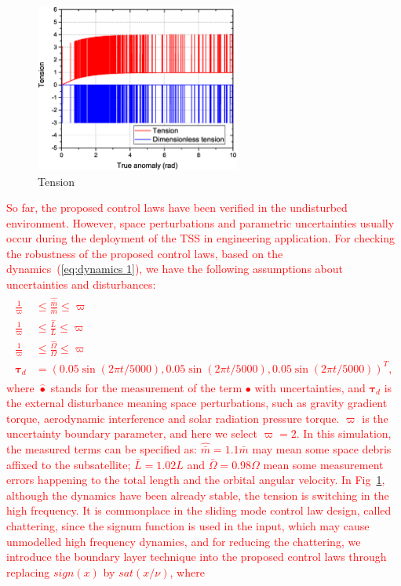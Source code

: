 \documentclass[3p]{elsarticle}
\theoremstyle{plain}
\theoremstyle{remark}
\begin{document}
\begin{figure}
\centering
\includegraphics[width=0.6\textwidth]{paper4_fig6.eps}
\caption{Tension}
\label{fig:6}
\end{figure}
\textcolor{red}{So far, the proposed control laws have been verified in the undisturbed environment. However, space perturbations and parametric uncertainties usually occur during the deployment of the TSS in engineering application. For checking the robustness of the proposed control laws, based on the dynamics~(\ref{eq:dynamics 1}), we have the following assumptions about uncertainties and disturbances:
\begin{align}\begin{split}
\frac{1}{\varpi}&\le\frac{\hat{\bar m}}{\bar m}\le \varpi\\
\frac{1}{\varpi}&\le\frac{\hat L}{L}\le \varpi\\
\frac{1}{\varpi}&\le\frac{\hat \Omega}{\Omega}\le \varpi\\
\bm\tau_d&=\left(0.05\sin(2\pi t/5000),0.05\sin(2\pi t/5000),0.05\sin(2\pi t/5000)\right)^T,
\end{split}\end{align}
where $\hat\bullet$ stands for the measurement of the term $\bullet$ with uncertainties, and $\bm\tau_d$ is the external disturbance meaning  space perturbations, such as gravity gradient torque, aerodynamic interference and solar radiation pressure torque. $\varpi$ is the uncertainty boundary parameter, and here we select $\varpi=2$. In this simulation, the measured terms can be specified as: $\hat{\bar m}=1.1\bar m$ may mean some space debris affixed to the subsatellite; $\bar L=1.02L$ and $\bar \Omega=0.98\Omega$ mean some measurement errors happening to the total length and the orbital angular velocity. In Fig~\ref{fig:6}, although the dynamics have been already stable, the tension is switching in the high frequency. It is commonplace in the sliding mode control law design, called chattering, since the signum function is used in the input, which may cause unmodelled high frequency dynamics, and for reducing the chattering, we introduce the boundary layer technique into the proposed control laws through replacing $sign(x)$ by $sat(x/\nu)$, where
}
\end{document}
